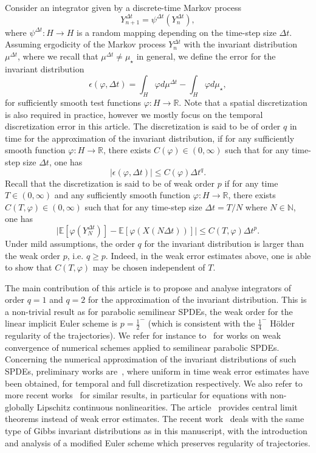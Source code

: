 \documentclass[11pt]{amsart}
\newcommand{\E}{\mathbb{E}}
\newcommand{\R}{\mathbb{R}}
\newcommand{\N}{\mathbb{N}}
\begin{document}
Consider an integrator given by a discrete-time Markov process
\begin{equation}
\label{equation:one_step_integrator}
Y_{n+1}^{\Delta t}=\psi^{\Delta t}(Y_n^{\Delta t}),
\end{equation}
where $\psi^{\Delta t}:H\to H$ is a random mapping depending on the time-step size $\Delta t$.
Assuming ergodicity of the Markov process $Y_n^{\Delta t}$ with the invariant distribution $\mu^{\Delta t}$, where we recall that $\mu^{\Delta t}\neq \mu_\star$ in general, we define the error for the invariant distribution
\[
\epsilon(\varphi,\Delta t)=\int_H \varphi d\mu^{\Delta t}-\int_H \varphi d\mu_\star,
\]
for sufficiently smooth test functions $\varphi:H\to\R$.
Note that a spatial discretization is also required in practice, however we mostly focus on the temporal discretization error in this article.
%
The discretization is said to be of order $q$ in time for the approximation of the invariant distribution, if for any sufficiently smooth function $\varphi:H\to\R$, there exists $C(\varphi)\in(0,\infty)$ such that for any time-step size $\Delta t$, one has
\[
|\epsilon(\varphi,\Delta t)|\le C(\varphi)\Delta t^q.
\]
%
Recall that the discretization is said to be of weak order $p$ if for any time $T\in(0,\infty)$ and any sufficiently smooth function $\varphi:H\to\R$, there exists $C(T,\varphi)\in(0,\infty)$ such that for any time-step size $\Delta t=T/N$ where $N\in\N$, one has
\[
\big|\E[\varphi(Y_N^{\Delta t})]-\E[\varphi(X(N\Delta t))]\big|\le C(T,\varphi)\Delta t^{p}.
\]
Under mild assumptions, the order $q$ for the invariant distribution is larger than the weak order $p$, i.e. $q\geq p$. Indeed, in the weak error estimates above, one is able to show that $C(T,\varphi)$ may be chosen independent of $T$.

The main contribution of this article is to propose and analyse integrators of order $q=1$ and $q=2$ for the approximation of the invariant distribution. This is a non-trivial result as for parabolic semilinear SPDEs, the weak order for the linear implicit Euler scheme is $p=\frac12^-$ (which is consistent with the $\frac14^-$ H\"older regularity of the trajectories). We refer for instance to~\cite{Andersson_Kruse_Larsson:16, Brehier:17, Brehier_Debussche:18,Brehier-Goudenege:20,Brehier_Hairer-Stuart:18,Conus_Jentzen_Kurniawan:19, Debussche:11, Debussche_Printems:09} for works on weak convergence of numerical schemes applied to semilinear parabolic SPDEs. Concerning the numerical approximation of the invariant distributions of such SPDEs, preliminary works are~\cite{Brehier:14, Brehier_Kopec:17}, where uniform in time weak error estimates have been obtained, for temporal and full discretization respectively. We also refer to more recent works~\cite{Brehier:22,Chen-Gan-Wang:20,Cui-Hong-Sun:21,Jiang-Wang,Liu:25,Wang-Cao} for similar results, in particular for equations with non-globally Lipschitz continuous nonlinearities. The article~\cite{Chen-Dang-Hong-Zhou:23} provides central limit theorems instead of weak error estimates. The recent work~\cite{Brehier:25focm} deals with the same type of Gibbs invariant distributions as in this manuscript, with the introduction and analysis of a modified Euler scheme which preserves regularity of trajectories.
\end{document}
